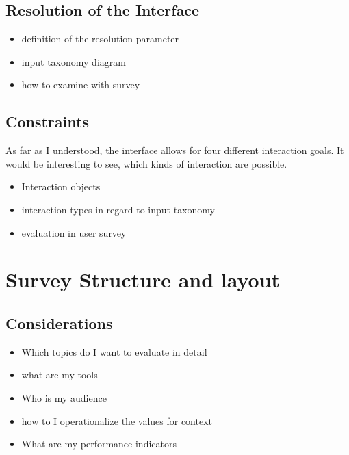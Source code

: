         \section{Resolution of the Interface}

            \begin{itemize}
                \item definition of the resolution parameter
                \item input taxonomy diagram
                \item how to examine with survey                                     
            \end{itemize}

        \section{Constraints}

            As far as I understood, the interface allows for four different interaction goals. It would be interesting to see, which kinds of interaction are possible.                

            \begin{itemize}
                \item Interaction objects
                \item interaction types in regard to input taxonomy
                \item evaluation in user survey
            \end{itemize}

    \chapter{Survey Structure and layout}

        \section{Considerations}

            \begin{itemize}
                \item Which topics do I want to evaluate in detail
                \item what are my tools
                \item Who is my audience
                \item how to I operationalize the values for context
                \item What are my performance indicators
            \end{itemize}

